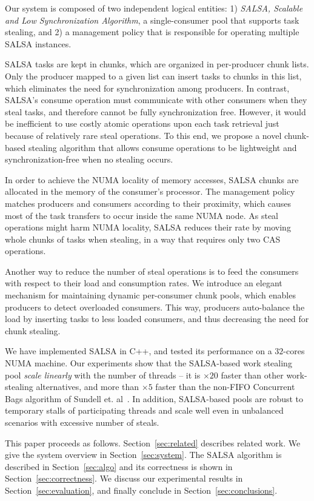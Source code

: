 Our system is composed of two independent logical entities: 1) \emph{SALSA, Scalable and Low Synchronization Algorithm}, a single-consumer pool that supports task stealing, and 2) a management policy that is responsible for operating multiple SALSA instances. 

SALSA tasks are kept in chunks, which are organized in per-producer chunk lists. Only the producer mapped to a given list can insert
tasks to chunks in this list, which eliminates the need for synchronization among producers. In contrast, SALSA's consume operation must communicate with other consumers when they steal tasks, and therefore cannot be fully synchronization free.
However, it would be inefficient to use costly atomic operations upon each task retrieval just because of relatively rare steal operations. 
To this end, we propose a novel chunk-based stealing algorithm that allows consume operations to be lightweight and synchronization-free when no stealing occurs. 

In order to achieve the NUMA locality of memory accesses, SALSA chunks are allocated in the memory of the consumer's processor. 
The management policy matches producers and consumers according to their proximity, which causes most of the task transfers to occur inside the same NUMA node. As steal operations might harm NUMA locality, SALSA reduces their rate by moving whole chunks of tasks when stealing, in a way that requires only two CAS operations.  

Another way to reduce the number of steal operations is to feed the consumers with respect to their load and consumption rates.
We introduce an elegant mechanism for maintaining dynamic per-consumer chunk pools, which enables producers to detect overloaded consumers. This way, producers auto-balance the load by inserting tasks to less loaded consumers, and thus decreasing the need for chunk stealing.

We have implemented SALSA in C++, and tested its performance on a $32$-cores NUMA machine. Our experiments show that the SALSA-based work stealing pool \emph{scale linearly} with the number of threads -- it is $\times20$ faster than other work-stealing alternatives, and more than $\times5$ faster than the non-FIFO Concurrent Bags algorithm of Sundell et. al~\cite{Sundell:2011:LAC:1989493.1989550}. In addition, SALSA-based pools are robust to temporary stalls of participating threads and scale well even in unbalanced scenarios with excessive number of steals. 

This paper proceeds as follows. Section~\ref{sec:related} describes related work. We give the system overview in Section~\ref{sec:system}. The SALSA algorithm is described in Section~\ref{sec:algo} and its correctness is shown in Section~\ref{sec:correctness}. We discuss our experimental results in Section~\ref{sec:evaluation}, and finally conclude in Section~\ref{sec:conclusions}.